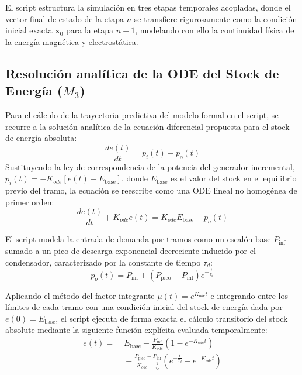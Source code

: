 \documentclass[11pt, a4paper]{article}
\theoremstyle{definition}
\theoremstyle{plain}
\theoremstyle{plain}
\theoremstyle{remark}
\theoremstyle{remark}
\theoremstyle{remark}
\begin{document}
El script estructura la simulación en tres etapas temporales acopladas, donde el vector final de estado de la etapa $n$ se transfiere rigurosamente como la condición inicial exacta $\mathbf{x}_0$ para la etapa $n+1$, modelando con ello la continuidad física de la energía magnética y electrostática.

\subsection{Resolución analítica de la ODE del Stock de Energía ($M_3$)}
Para el cálculo de la trayectoria predictiva del modelo formal en el script, se recurre a la solución analítica de la ecuación diferencial propuesta para el stock de energía absoluta:
\begin{equation}
	\label{eq:ode_energia_abs}
	\frac{de(t)}{dt} = p_i(t) - p_o(t)
\end{equation}
Sustituyendo la ley de correspondencia de la potencia del generador incremental, $p_i(t) = -K_{ode}[e(t) - E_{\text{base}}]$, donde $E_{\text{base}}$ es el valor del stock en el equilibrio previo del tramo, la ecuación se reescribe como una ODE lineal no homogénea de primer orden:
\begin{equation}
	\frac{de(t)}{dt} + K_{ode} e(t) = K_{ode} E_{\text{base}} - p_o(t)
\end{equation}

El script modela la entrada de demanda por tramos como un escalón base $P_{\text{inf}}$ sumado a un pico de descarga exponencial decreciente inducido por el condensador, caracterizado por la constante de tiempo $\tau_d$:
\begin{equation}
	p_o(t) = P_{\text{inf}} + \left( P_{\text{pico}} - P_{\text{inf}} \right) e^{-\frac{t}{\tau_d}}
\end{equation}

Aplicando el método del factor integrante $\mu(t) = e^{K_{ode} t}$ e integrando entre los límites de cada tramo con una condición inicial del stock de energía dada por $e(0) = E_{\text{base}}$, el script ejecuta de forma exacta el cálculo transitorio del stock absolute mediante la siguiente función explícita evaluada temporalmente:
\begin{align}
	e(t) = & \; E_{\text{base}} - \frac{P_{\text{inf}}}{K_{ode}}\left(1 - e^{-K_{ode} t}\right) \nonumber \\
	& \; - \frac{P_{\text{pico}} - P_{\text{inf}}}{K_{ode} - \frac{1}{\tau_d}} \left( e^{-\frac{t}{\tau_d}} - e^{-K_{ode} t} \right)
\end{align}
\end{document}
